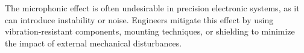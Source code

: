 The microphonic effect is often undesirable in precision electronic systems, as it can introduce instability or noise. Engineers mitigate this effect by using vibration-resistant components, mounting techniques, or shielding to minimize the impact of external mechanical disturbances.

